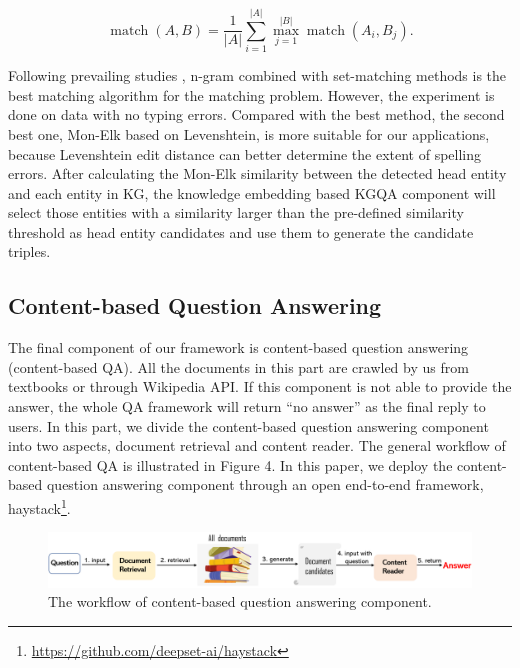 \documentclass[11pt]{article}
\begin{document}
\begin{equation}
    \operatorname{match}(A, B)=\frac{1}{|A|} \sum_{i=1}^{|A|} \max _{j=1}^{|B|} \operatorname{match}\left(A_i, B_j\right).
    \label{equ:match}
\end{equation}

Following prevailing studies \cite{c29}, n-gram combined with set-matching methods is the best matching algorithm for the matching problem. However, the experiment is done on data with no typing errors. Compared with the best method, the second best one, Mon-Elk based on Levenshtein, is more suitable for our applications, because Levenshtein edit distance can better determine the extent of spelling errors. After calculating the Mon-Elk similarity between the detected head entity and each entity in KG, the knowledge embedding based KGQA component will select those entities with a similarity larger than the pre-defined similarity threshold as head entity candidates and use them to generate the candidate triples.

\subsection{Content-based Question Answering}\label{sec:CONTENT-BASED QA}
The final component of our framework is content-based question answering (content-based QA). All the documents in this part are crawled by us from textbooks or through Wikipedia API. If this component is not able to provide the answer, the whole QA framework will return ``no answer'' as the final reply to users. In this part, we divide the content-based question answering component into two aspects, document retrieval and content reader. The general workflow of content-based QA is illustrated in Figure 4. In this paper, we deploy the content-based question answering component through an open end-to-end framework, haystack\footnote{\url{https://github.com/deepset-ai/haystack}}.


\begin{figure}[htp]
    \centering
    \includegraphics[width=17cm]{submissions/kbqa-colledge/figs/figure4.pdf}
    \caption{The workflow of content-based question answering component.}
\end{figure}
\end{document}
